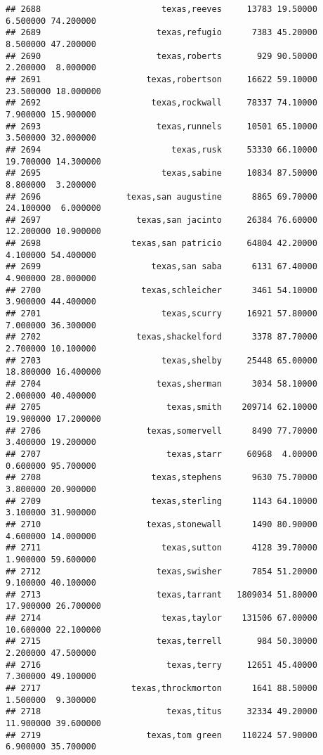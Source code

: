 \documentclass[
]{article}
\begin{document}
\begin{verbatim}
## 2688                        texas,reeves     13783 19.50000  6.500000 74.200000
## 2689                       texas,refugio      7383 45.20000  8.500000 47.200000
## 2690                       texas,roberts       929 90.50000  2.200000  8.000000
## 2691                     texas,robertson     16622 59.10000 23.500000 18.000000
## 2692                      texas,rockwall     78337 74.10000  7.900000 15.900000
## 2693                       texas,runnels     10501 65.10000  3.500000 32.000000
## 2694                          texas,rusk     53330 66.10000 19.700000 14.300000
## 2695                        texas,sabine     10834 87.50000  8.800000  3.200000
## 2696                 texas,san augustine      8865 69.70000 24.100000  6.000000
## 2697                   texas,san jacinto     26384 76.60000 12.200000 10.900000
## 2698                  texas,san patricio     64804 42.20000  4.100000 54.400000
## 2699                      texas,san saba      6131 67.40000  4.900000 28.000000
## 2700                    texas,schleicher      3461 54.10000  3.900000 44.400000
## 2701                        texas,scurry     16921 57.80000  7.000000 36.300000
## 2702                   texas,shackelford      3378 87.70000  2.700000 10.100000
## 2703                        texas,shelby     25448 65.00000 18.800000 16.400000
## 2704                       texas,sherman      3034 58.10000  2.000000 40.400000
## 2705                         texas,smith    209714 62.10000 19.900000 17.200000
## 2706                     texas,somervell      8490 77.70000  3.400000 19.200000
## 2707                         texas,starr     60968  4.00000  0.600000 95.700000
## 2708                      texas,stephens      9630 75.70000  3.800000 20.900000
## 2709                      texas,sterling      1143 64.10000  3.100000 31.900000
## 2710                     texas,stonewall      1490 80.90000  4.600000 14.000000
## 2711                        texas,sutton      4128 39.70000  1.900000 59.600000
## 2712                       texas,swisher      7854 51.20000  9.100000 40.100000
## 2713                       texas,tarrant   1809034 51.80000 17.900000 26.700000
## 2714                        texas,taylor    131506 67.00000 10.600000 22.100000
## 2715                       texas,terrell       984 50.30000  2.200000 47.500000
## 2716                         texas,terry     12651 45.40000  7.300000 49.100000
## 2717                  texas,throckmorton      1641 88.50000  1.500000  9.300000
## 2718                         texas,titus     32334 49.20000 11.900000 39.600000
## 2719                     texas,tom green    110224 57.90000  6.900000 35.700000

\end{verbatim}
\end{document}
